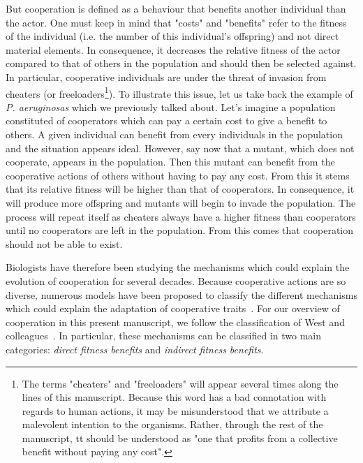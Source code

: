     But cooperation is defined as a behaviour that benefits another individual than the actor. One must keep in mind that "costs" and "benefits" refer to the fitness of the individual (i.e. the number of this individual's offspring) and not direct material elements. In consequence, it decreases the relative fitness of the actor compared to that of others in the population and should then be selected against. In particular, cooperative individuals are under the threat of invasion from cheaters (or freeloaders\footnote{The terms "cheaters" and "freeloaders" will appear several times along the lines of this manuscript. Because this word has a bad connotation with regards to human actions, it may be misunderstood that we attribute a malevolent intention to the organisms. Rather, through the rest of the manuscript, tt should be understood as "one that profits from a collective benefit without paying any cost".}). To illustrate this issue, let us take back the example of \emph{P. aeruginosas} which we previously talked about. Let's imagine a population constituted of cooperators which can pay a certain cost to give a benefit to others. A given individual can benefit from every individuals in the population and the situation appears ideal. However, say now that a mutant, which does not cooperate, appears in the population. Then this mutant can benefit from the cooperative actions of others without having to pay any cost. From this it stems that its relative fitness will be higher than that of cooperators. In consequence, it will produce more offspring and mutants will begin to invade the population. The process will repeat itself as cheaters always have a higher fitness than cooperators until no cooperators are left in the population. From this comes that cooperation should not be able to exist. 

    Biologists have therefore been studying the mechanisms which could explain the evolution of cooperation for several decades. Because cooperative actions are so diverse, numerous models have been proposed to classify the different mechanisms which could explain the adaptation of cooperative traits~\parencite{Dugatkin2002, Keller2006, Bergmuller2007a, West2007}. For our overview of cooperation in this present manuscript, we follow the classification of West and colleagues~\parencite{West2007a}. In particular, these mechanisms can be classified in two main categories: \emph{direct fitness benefits} and \emph{indirect fitness benefits}.


